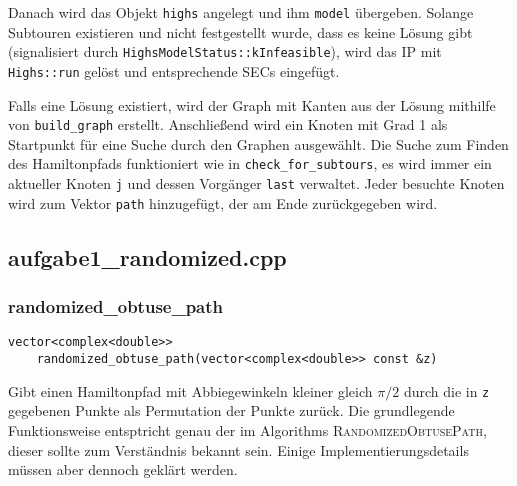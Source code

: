 \documentclass[a4paper, 10pt, ngerman]{article}
\begin{document}
Danach wird das Objekt \verb|highs| angelegt und ihm \verb|model| übergeben. Solange Subtouren existieren und nicht festgestellt wurde, dass es keine Lösung gibt (signalisiert durch \verb|HighsModelStatus::kInfeasible|), wird das IP mit \verb|Highs::run| gelöst und entsprechende SECs eingefügt.

Falls eine Lösung existiert, wird der Graph mit Kanten aus der Lösung mithilfe von \verb|build_graph| erstellt. Anschließend wird ein Knoten mit Grad 1 als Startpunkt für eine Suche durch den Graphen ausgewählt. Die Suche zum Finden des Hamiltonpfads funktioniert wie in \verb|check_for_subtours|, es wird immer ein aktueller Knoten \verb|j| und dessen Vorgänger \verb|last| verwaltet. Jeder besuchte Knoten wird zum Vektor \verb|path| hinzugefügt, der am Ende zurückgegeben wird.

\subsection{aufgabe1\_randomized.cpp}

\subsubsection{randomized\_obtuse\_path}

\verb|vector<complex<double>>| \\
\verb|    randomized_obtuse_path(vector<complex<double>> const &z)|
\medskip

\noindent Gibt einen Hamiltonpfad mit Abbiegewinkeln kleiner gleich $\pi / 2$ durch die in \verb|z| gegebenen Punkte als Permutation der Punkte zurück. Die grundlegende Funktionsweise entsptricht genau der im Algorithms \textsc{RandomizedObtusePath}, dieser sollte zum Verständnis bekannt sein. Einige Implementierungsdetails müssen aber dennoch geklärt werden.
\end{document}
